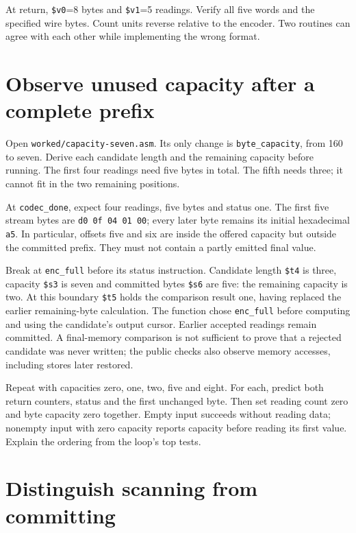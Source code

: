 At return, \texttt{\$v0}=8 bytes and \texttt{\$v1}=5 readings. Verify all five
words and the specified wire bytes. Count units reverse relative to the encoder.
Two routines can agree with each other while implementing the wrong format.

\section{Observe unused capacity after a complete prefix}

Open \texttt{worked/capacity-seven.asm}. Its only change is
\texttt{byte\_capacity}, from 160 to seven.
Derive each candidate length and the remaining capacity before running.
The first four readings need five bytes in total. The fifth needs three;
it cannot fit in the two remaining positions.

At \texttt{codec\_done}, expect four readings, five bytes and status one.
The first five stream bytes are \texttt{d0 0f 04 01 00}; every later byte remains
its initial hexadecimal \texttt{a5}. In particular, offsets five and six are
inside the offered capacity but outside the committed prefix. They must not
contain a partly emitted final value.



Break at \texttt{enc\_full} before its status instruction. Candidate length
\texttt{\$t4} is three, capacity \texttt{\$s3} is seven and committed bytes
\texttt{\$s6} are five: the remaining capacity is two. At this boundary
\texttt{\$t5} holds the comparison result one, having replaced the earlier
remaining-byte calculation. The function chose \texttt{enc\_full} before
computing and using the candidate's output cursor. Earlier accepted
readings remain committed. A final-memory comparison is not sufficient to prove
that a rejected candidate was never written; the public checks also observe
memory accesses, including stores later restored.

Repeat with capacities zero, one, two, five and eight. For each, predict both
return counters, status and the first unchanged byte. Then set reading count
zero and byte capacity zero together. Empty input succeeds without reading data;
nonempty input with zero capacity reports capacity before reading its first value.
Explain the ordering from the loop's top tests.

\section{Distinguish scanning from committing}

